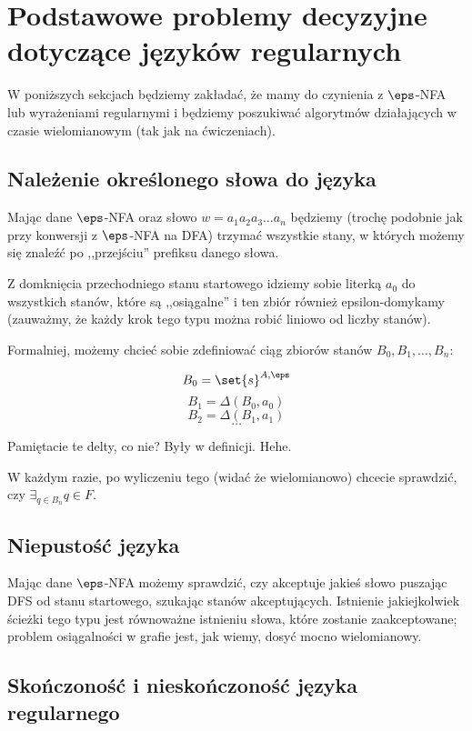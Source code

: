 \section{Podstawowe problemy decyzyjne dotyczące języków regularnych}

W poniższych sekcjach będziemy zakładać, że mamy do czynienia z \( \eps\)-NFA lub wyrażeniami regularnymi i będziemy poszukiwać algorytmów działających w czasie wielomianowym (tak jak na ćwiczeniach). 

\subsection{Należenie określonego słowa do języka}

Mając dane \(\eps\)-NFA oraz słowo \(w = a_1a_2a_3\dots a_n\) będziemy (trochę podobnie jak przy konwersji z \(\eps\)-NFA na DFA) trzymać wszystkie stany, w których możemy się znaleźć po ,,przejściu'' prefiksu danego słowa.

Z domknięcia przechodniego stanu startowego idziemy sobie literką \(a_0\) do wszystkich stanów, które są ,,osiągalne'' i ten zbiór również epsilon-domykamy (zauważmy, że każdy krok tego typu można robić liniowo od liczby stanów). 

Formalniej, możemy chcieć sobie zdefiniować ciąg zbiorów stanów \(B_{0}, B_{1}, \dots, B_{n} \):

\[ 
B_{0} = \set{s}^{A, \eps}
\]
\[
B_1 = \Delta(B_0, a_0) 
\]
\[
B_2 = \Delta(B_1, a_1)
\]
\[ 
\dots 
\]

Pamiętacie te delty, co nie? Były w definicji. Hehe. 

W każdym razie, po wyliczeniu tego (widać że wielomianowo) chcecie sprawdzić, czy \( \exists_{q \in B_n} q \in F \).

\subsection{Niepustość języka}

Mając dane \(\eps\)-NFA możemy sprawdzić, czy akceptuje jakieś słowo puszając DFS od stanu startowego, szukając stanów akceptujących. Istnienie jakiejkolwiek ścieżki tego typu jest równoważne istnieniu słowa, które zostanie zaakceptowane; problem osiągalności w grafie jest, jak wiemy, dosyć mocno wielomianowy. 

\subsection{Skończoność i nieskończoność języka regularnego}

